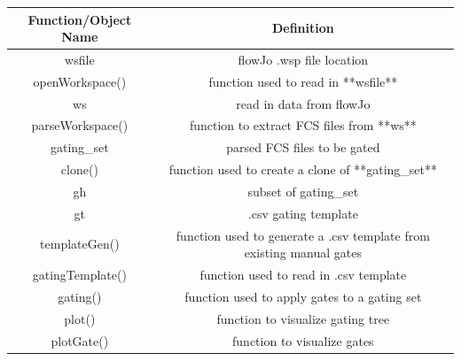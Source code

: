 \documentclass[]{book}
\begin{document}
\begin{tabular}{c|c}
\hline
Function/Object Name & Definition\\
\hline
wsfile & flowJo .wsp file location\\
\hline
openWorkspace() & function used to read in **wsfile**\\
\hline
ws & read in data from flowJo\\
\hline
parseWorkspace() & function to extract FCS files from **ws**\\
\hline
gating\_set & parsed FCS files to be gated\\
\hline
clone() & function used to create a clone of **gating\_set**\\
\hline
gh & subset of gating\_set\\
\hline
gt & .csv gating template\\
\hline
templateGen() & function used to generate a .csv template from existing manual gates\\
\hline
gatingTemplate() & function used to read in .csv template\\
\hline
gating() & function used to apply gates to a gating set\\
\hline
plot() & function to visualize gating tree\\
\hline
plotGate() & function to visualize gates\\
\hline
\end{tabular}
\end{document}
